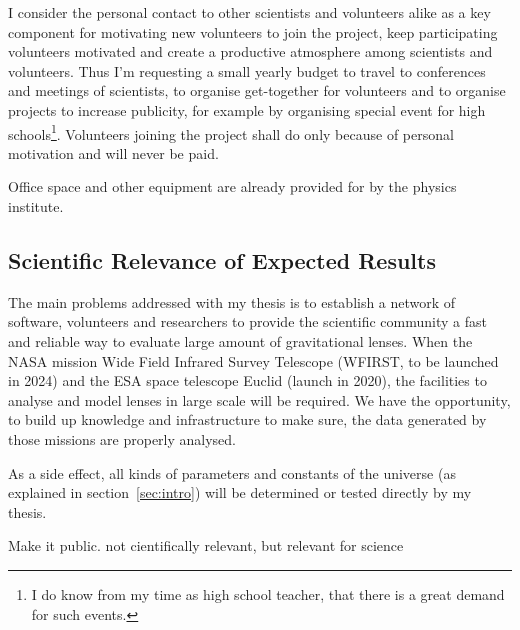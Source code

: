 \documentclass[11pt]{article}
\begin{document}
I consider the personal contact to other scientists and volunteers alike as a key component for motivating new volunteers to join the project, keep participating volunteers motivated and create a productive atmosphere among scientists and volunteers.
Thus I'm requesting a small yearly budget to travel to conferences and meetings of scientists, to organise get-together for volunteers and to organise projects to increase publicity, for example by organising special event for high schools\footnote{I do know from my time as high school teacher, that there is a great demand for such events.}.
Volunteers joining the project shall do only because of personal motivation and will never be paid.

Office space and other equipment are already provided for by the physics institute.




\subsection{Scientific Relevance of Expected Results}

The main problems addressed with my thesis is to establish a network of software, volunteers and researchers to provide the scientific community a fast and reliable way to evaluate large amount of gravitational lenses.
When the NASA mission Wide Field Infrared Survey Telescope (WFIRST, to be launched in 2024) and the ESA space telescope Euclid (launch in 2020), the facilities to analyse and model lenses in large scale will be required.
We have the opportunity, to build up knowledge and infrastructure to make sure, the data generated by those missions are properly analysed.



As a side effect, all kinds of parameters and constants of the universe (as explained in section~\ref{sec:intro}) will be determined or tested directly by my thesis.



Make it public. not cientifically relevant, but relevant for science

\newpage


\end{document}
